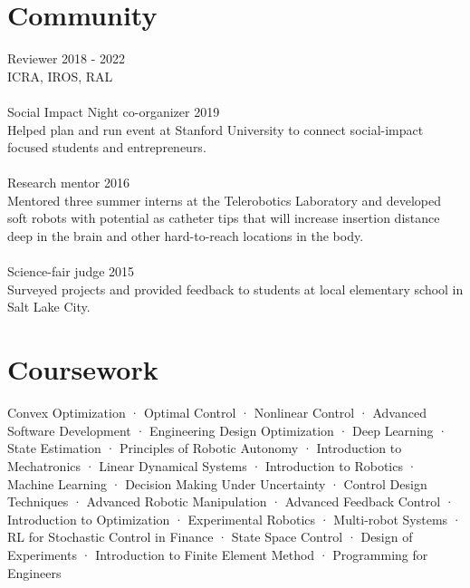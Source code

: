 \documentclass[10pt]{article}
\begin{document}
\section*{Community}
Reviewer \hfill 2018 - 2022 \\
{\color{lightgray} ICRA, IROS, RAL} 
\\
\\
Social Impact Night co-organizer \hfill 2019\\
{\color{lightgray} Helped plan and run event at Stanford University to connect social-impact focused students and entrepreneurs.} 
\\
\\
Research mentor \hfill 2016 \\
{\color{lightgray} Mentored three summer interns at the Telerobotics Laboratory and developed soft robots with potential as catheter tips that will increase insertion distance deep in the brain and other hard-to-reach locations in the body.}
\\
\\
Science-fair judge \hfill 2015\\
{\color{lightgray} Surveyed projects and provided feedback to students at local elementary school in Salt Lake City.}

\section*{Coursework}
{\color{lightgray} Convex Optimization · Optimal Control · Nonlinear Control · Advanced Software Development · Engineering Design Optimization · Deep Learning · State Estimation · Principles of Robotic Autonomy · Introduction to Mechatronics · Linear Dynamical Systems · Introduction to Robotics · Machine Learning · Decision Making Under Uncertainty · Control Design Techniques · Advanced Robotic Manipulation · Advanced Feedback Control · Introduction to Optimization · Experimental Robotics · Multi-robot Systems · RL for Stochastic Control in Finance · State Space Control · Design of Experiments · Introduction to Finite Element Method · Programming for Engineers}
\end{document}

